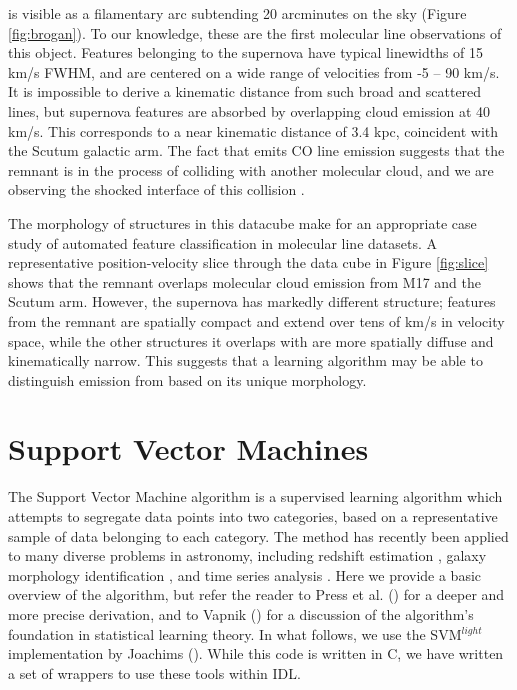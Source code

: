 \snr{} is visible as a filamentary arc subtending 20 arcminutes on the sky (Figure \ref{fig:brogan}). To our knowledge, these are the first molecular line observations of this object. Features belonging to the supernova have typical linewidths of 15 km/s FWHM, and are centered on a wide range of velocities from -5 -- 90 km/s. It is impossible to derive a kinematic distance from such broad and scattered lines, but supernova features are absorbed by overlapping cloud emission at 40 km/s. This corresponds to a near kinematic distance of 3.4 kpc, coincident with the Scutum galactic arm. The fact that \snr{} emits CO line emission suggests that the remnant is in the process of colliding with another molecular cloud, and we are observing the shocked interface of this collision \citep{Scoville77, vanDishoeck93}.

The morphology of structures in this datacube make for an appropriate case study of automated feature classification in molecular line datasets. A representative position-velocity slice through the data cube in Figure \ref{fig:slice} shows that the remnant overlaps molecular cloud emission from M17 and the Scutum arm. However, the supernova has markedly different structure; features from the remnant are spatially compact and extend over tens of km/s in velocity space, while the other structures it overlaps with are more spatially diffuse and kinematically narrow. This suggests that a learning algorithm may be able to  distinguish emission from \snr{} based on its unique morphology.

\section{Support Vector Machines}
The Support Vector Machine algorithm is a supervised learning algorithm which attempts to segregate data points into two categories, based on a representative sample of data belonging to each category. The method has recently been applied to many diverse problems in astronomy, including redshift estimation \citep{Wang08}, galaxy morphology identification \citep{Huertas08}, and time series analysis \citep{Kim11}. Here we provide a basic overview of the algorithm, but refer the reader to Press et al. (\citeyear{Press07}) for a deeper and more precise derivation, and to Vapnik (\citeyear{Vapnik99}) for a discussion of the algorithm's foundation in statistical learning theory. In what follows, we use the SVM$^{light}$ implementation by Joachims (\citeyear{Joachims99}). While this code is written in C, we have written a set of wrappers to use these tools within IDL.

